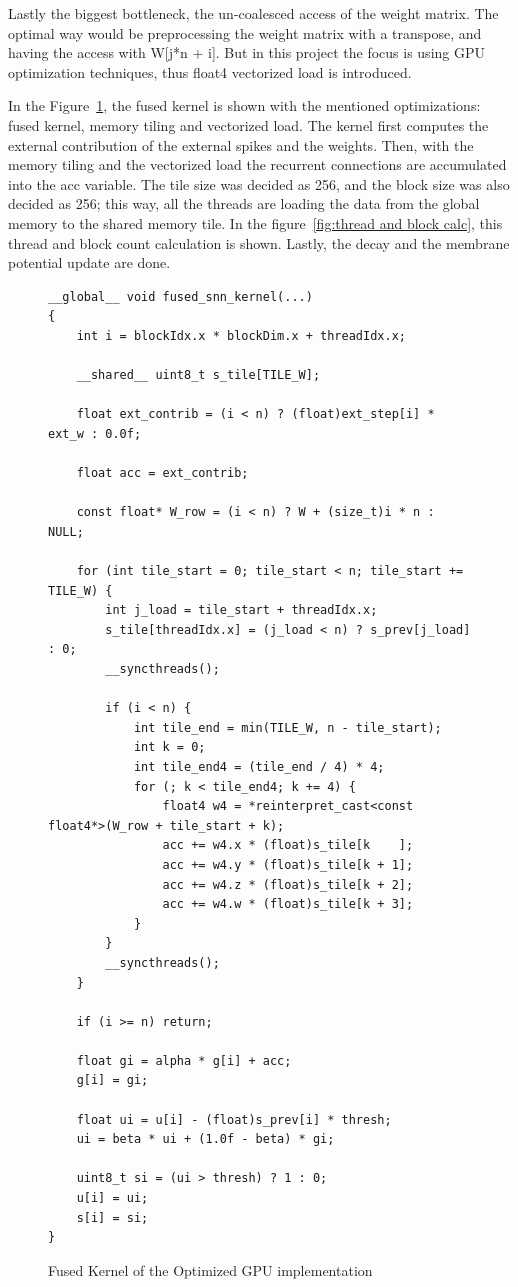 \documentclass[conference]{IEEEtran}
\begin{document}
Lastly the biggest bottleneck, the un-coalesced access of the weight matrix. 
The optimal way would be preprocessing the weight matrix with a transpose, and having the access with W[j*n + i]. 
But in this project the focus is using GPU optimization techniques, thus float4 vectorized load is introduced.

In the Figure~\ref{fig:Fused_Optimized_GPU_impl}, the fused kernel is shown with the mentioned optimizations: fused kernel, memory tiling and vectorized load.
The kernel first computes the external contribution of the external spikes and the weights. 
Then, with the memory tiling and the vectorized load the recurrent connections are accumulated into the acc variable.
The tile size was decided as 256, and the block size was also decided as 256; this way, all the threads are loading the data from the global memory to the shared memory tile.
In the figure~\ref{fig:thread and block calc}, this thread and block count calculation is shown. 
Lastly, the decay and the membrane potential update are done.

  \begin{figure}[h]
\centering
\begin{lstlisting}
__global__ void fused_snn_kernel(...)
{
    int i = blockIdx.x * blockDim.x + threadIdx.x;

    __shared__ uint8_t s_tile[TILE_W];

    float ext_contrib = (i < n) ? (float)ext_step[i] * ext_w : 0.0f;

    float acc = ext_contrib;

    const float* W_row = (i < n) ? W + (size_t)i * n : NULL;

    for (int tile_start = 0; tile_start < n; tile_start += TILE_W) {
        int j_load = tile_start + threadIdx.x;
        s_tile[threadIdx.x] = (j_load < n) ? s_prev[j_load] : 0;
        __syncthreads();

        if (i < n) {
            int tile_end = min(TILE_W, n - tile_start);
            int k = 0;
            int tile_end4 = (tile_end / 4) * 4;
            for (; k < tile_end4; k += 4) {
                float4 w4 = *reinterpret_cast<const float4*>(W_row + tile_start + k);
                acc += w4.x * (float)s_tile[k    ];
                acc += w4.y * (float)s_tile[k + 1];
                acc += w4.z * (float)s_tile[k + 2];
                acc += w4.w * (float)s_tile[k + 3];
            }
        }
        __syncthreads();
    }

    if (i >= n) return;

    float gi = alpha * g[i] + acc;
    g[i] = gi; 

    float ui = u[i] - (float)s_prev[i] * thresh;
    ui = beta * ui + (1.0f - beta) * gi;

    uint8_t si = (ui > thresh) ? 1 : 0;
    u[i] = ui;
    s[i] = si;
}
\end{lstlisting}
\caption{Fused Kernel of the Optimized GPU implementation}
\label{fig:Fused_Optimized_GPU_impl}
\end{figure}
\end{document}
